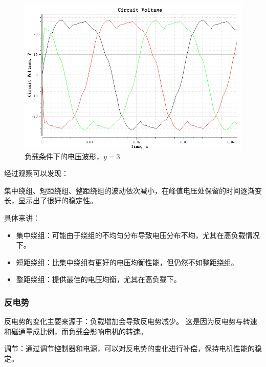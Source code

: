 \documentclass{thuemp}
\begin{document}
\begin{figure}[H]
  \centering
  \includegraphics[width=1\linewidth]{./img/task2/voltage-y3-load.png}
  \caption{负载条件下的电压波形，$y=3$}
\end{figure}
经过观察可以发现：

集中绕组、短距绕组、整距绕组的波动依次减小，在峰值电压处保留的时间逐渐变长，显示出了很好的稳定性。

具体来讲：
\begin{itemize}
	\item 集中绕组：可能由于绕组的不均匀分布导致电压分布不均，尤其在高负载情况下。
	\item 短距绕组：比集中绕组有更好的电压均衡性能，但仍然不如整距绕组。
	\item 整距绕组：提供最佳的电压均衡，尤其在高负载下。
\end{itemize}

\subsubsection{反电势}
反电势的变化主要来源于：负载增加会导致反电势减少。
这是因为反电势与转速和磁通量成比例，而负载会影响电机的转速。

调节：通过调节控制器和电源，可以对反电势的变化进行补偿，保持电机性能的稳定。
\end{document}
